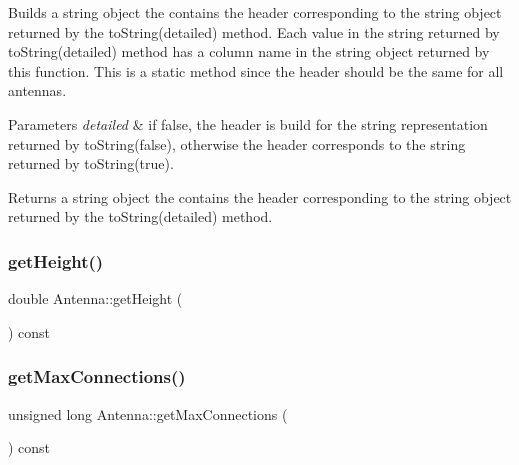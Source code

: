 Builds a string object the contains the header corresponding to the string object returned by the to\+String(detailed) method. Each value in the string returned by to\+String(detailed) method has a column name in the string object returned by this function. This is a static method since the header should be the same for all antennas. 
\begin{DoxyParams}{Parameters}
{\em detailed} & if false, the header is build for the string representation returned by to\+String(false), otherwise the header corresponds to the string returned by to\+String(true). \\
\hline
\end{DoxyParams}
\begin{DoxyReturn}{Returns}
a string object the contains the header corresponding to the string object returned by the to\+String(detailed) method. 
\end{DoxyReturn}
\mbox{\label{class_antenna_a04be1246cff927d077d62a82ed7eb25e}} 
\subsubsection{\texorpdfstring{get\+Height()}{getHeight()}}
{\footnotesize\ttfamily double Antenna\+::get\+Height (\begin{DoxyParamCaption}{ }\end{DoxyParamCaption}) const\hspace{0.3cm}{\ttfamily [private]}}

\mbox{\label{class_antenna_ac7d42215283cd7d4dc16d449f61af91d}} 
\subsubsection{\texorpdfstring{get\+Max\+Connections()}{getMaxConnections()}}
{\footnotesize\ttfamily unsigned long Antenna\+::get\+Max\+Connections (\begin{DoxyParamCaption}{ }\end{DoxyParamCaption}) const\hspace{0.3cm}{\ttfamily [private]}}

\mbox{\label{class_antenna_a1c6126c232ee496b9b693fc20e4892f5}} 
